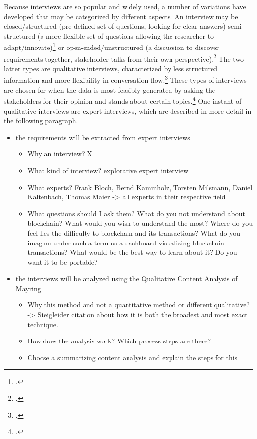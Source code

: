Because interviews are so popular and widely used, a number of variations have developed that may be categorized by different aspects. An interview may be closed/structured (pre-defined set of questions, looking for clear answers) semi-structured (a more flexible set of questions allowing the researcher to adapt/innovate)\footcites[Cf.][p.39]{EdwardsWhatqualitativeinterviewing2013} or open-ended/unstructured (a discussion to discover requirements together, stakeholder talks from their own perspective).\footcites[Cf.][p.2]{TiwariMethodologySelectionRequirement2017}[cf.][p.40]{EdwardsWhatqualitativeinterviewing2013} The two latter types are qualitative interviews, characterized by less structured information and more flexibility in conversation flow.\footcite[Cf.][p.13]{EdwardsWhatqualitativeinterviewing2013} These types of interviews are chosen for when the data is most feasibly generated by asking the stakeholders for their opinion and stands about certain topics.\footcite[Cf.][p.76]{MasonQualitativeresearching2002} One instant of qualitative interviews are expert interviews, which are described in more detail in the following paragraph.


\begin{itemize}
    \item the requirements will be extracted from expert interviews
    \begin{itemize}
        \item Why an interview? X
        \item What kind of interview? explorative expert interview
        \item What experts? Frank Bloch, Bernd Kammholz, Torsten Milsmann, Daniel Kaltenbach, Thomas Maier -> all experts in their respective field
        \item What questions should I ask them? What do you not understand about blockchain? What would you wish to understand the most? Where do you feel lies the difficulty to blockchain and its transactions? What do you imagine under such a term as a dashboard visualizing blockchain transactions? What would be the best way to learn about it? Do you want it to be portable?
    \end{itemize}
    \item the interviews will be analyzed using the Qualitative Content Analysis of Mayring
    \begin{itemize}
        \item Why this method and not a quantitative method or different qualitative? -> Steigleider citation about how it is both the broadest and most exact technique. 
        \item How does the analysis work? Which process steps are there?
        \item Choose a summarizing content analysis and explain the steps for this
    \end{itemize}
\end{itemize}

